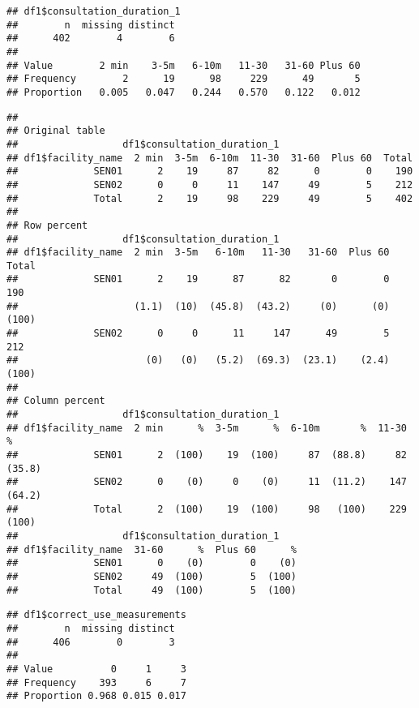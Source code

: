 \documentclass[
]{article}
\begin{document}
\begin{verbatim}
## df1$consultation_duration_1 
##        n  missing distinct 
##      402        4        6 
##                                                           
## Value        2 min    3-5m   6-10m   11-30   31-60 Plus 60
## Frequency        2      19      98     229      49       5
## Proportion   0.005   0.047   0.244   0.570   0.122   0.012
\end{verbatim}

\begin{verbatim}
## 
## Original table 
##                  df1$consultation_duration_1
## df1$facility_name  2 min  3-5m  6-10m  11-30  31-60  Plus 60  Total
##             SEN01      2    19     87     82      0        0    190
##             SEN02      0     0     11    147     49        5    212
##             Total      2    19     98    229     49        5    402
## 
## Row percent 
##                  df1$consultation_duration_1
## df1$facility_name  2 min  3-5m   6-10m   11-30   31-60  Plus 60  Total
##             SEN01      2    19      87      82       0        0    190
##                    (1.1)  (10)  (45.8)  (43.2)     (0)      (0)  (100)
##             SEN02      0     0      11     147      49        5    212
##                      (0)   (0)   (5.2)  (69.3)  (23.1)    (2.4)  (100)
## 
## Column percent 
##                  df1$consultation_duration_1
## df1$facility_name  2 min      %  3-5m      %  6-10m       %  11-30       %
##             SEN01      2  (100)    19  (100)     87  (88.8)     82  (35.8)
##             SEN02      0    (0)     0    (0)     11  (11.2)    147  (64.2)
##             Total      2  (100)    19  (100)     98   (100)    229   (100)
##                  df1$consultation_duration_1
## df1$facility_name  31-60      %  Plus 60      %
##             SEN01      0    (0)        0    (0)
##             SEN02     49  (100)        5  (100)
##             Total     49  (100)        5  (100)
\end{verbatim}

\begin{verbatim}
## df1$correct_use_measurements 
##        n  missing distinct 
##      406        0        3 
##                             
## Value          0     1     3
## Frequency    393     6     7
## Proportion 0.968 0.015 0.017
\end{verbatim}
\end{document}
